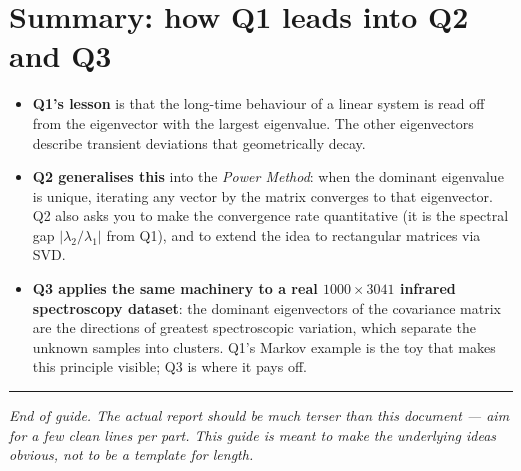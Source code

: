 \documentclass[12pt,a4paper]{article}
\begin{document}
\section*{Summary: how Q1 leads into Q2 and Q3}

\begin{itemize}[leftmargin=*]
    \item \textbf{Q1's lesson} is that the long-time behaviour of a linear system is read off from the eigenvector with the largest eigenvalue. The other eigenvectors describe transient deviations that geometrically decay.
    \item \textbf{Q2 generalises this} into the \emph{Power Method}: when the dominant eigenvalue is unique, iterating any vector by the matrix converges to that eigenvector. Q2 also asks you to make the convergence rate quantitative (it is the spectral gap $|\lambda_2/\lambda_1|$ from Q1), and to extend the idea to rectangular matrices via SVD.
    \item \textbf{Q3 applies the same machinery to a real $1000\times 3041$ infrared spectroscopy dataset}: the dominant eigenvectors of the covariance matrix are the directions of greatest spectroscopic variation, which separate the unknown samples into clusters. Q1's Markov example is the toy that makes this principle visible; Q3 is where it pays off.
\end{itemize}

\vfill
\hrule
\smallskip
\noindent\textit{End of guide. The actual report should be much terser than this document --- aim for a few clean lines per part. This guide is meant to make the underlying ideas obvious, not to be a template for length.}
\end{document}
